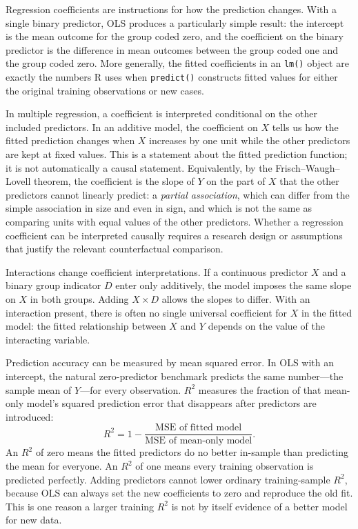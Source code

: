 \documentclass[11pt]{report}
\begin{document}
Regression coefficients are instructions for how the prediction changes. With a single binary predictor, OLS produces a particularly simple result: the intercept is the mean outcome for the group coded zero, and the coefficient on the binary predictor is the difference in mean outcomes between the group coded one and the group coded zero. More generally, the fitted coefficients in an \texttt{lm()} object are exactly the numbers R uses when \texttt{predict()} constructs fitted values for either the original training observations or new cases.

In multiple regression, a coefficient is interpreted conditional on the other included predictors. In an additive model, the coefficient on \(X\) tells us how the fitted prediction changes when \(X\) increases by one unit while the other predictors are kept at fixed values. This is a statement about the fitted prediction function; it is not automatically a causal statement. Equivalently, by the Frisch--Waugh--Lovell theorem, the coefficient is the slope of \(Y\) on the part of \(X\) that the other predictors cannot linearly predict: a \emph{partial association}, which can differ from the simple association in size and even in sign, and which is not the same as comparing units with equal values of the other predictors. Whether a regression coefficient can be interpreted causally requires a research design or assumptions that justify the relevant counterfactual comparison.

Interactions change coefficient interpretations. If a continuous predictor \(X\) and a binary group indicator \(D\) enter only additively, the model imposes the same slope on \(X\) in both groups. Adding \(X\times D\) allows the slopes to differ. With an interaction present, there is often no single universal coefficient for \(X\) in the fitted model: the fitted relationship between \(X\) and \(Y\) depends on the value of the interacting variable.

Prediction accuracy can be measured by mean squared error. In OLS with an intercept, the natural zero-predictor benchmark predicts the same number---the sample mean of \(Y\)---for every observation. \(R^2\) measures the fraction of that mean-only model's squared prediction error that disappears after predictors are introduced:
\[
R^2
=
1-
\frac{\text{MSE of fitted model}}
{\text{MSE of mean-only model}}.
\]
An \(R^2\) of zero means the fitted predictors do no better in-sample than predicting the mean for everyone. An \(R^2\) of one means every training observation is predicted perfectly. Adding predictors cannot lower ordinary training-sample \(R^2\), because OLS can always set the new coefficients to zero and reproduce the old fit. This is one reason a larger training \(R^2\) is not by itself evidence of a better model for new data.
\end{document}

